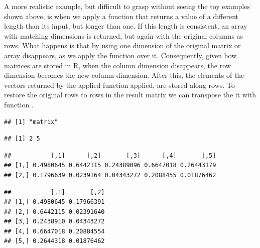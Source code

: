 \documentclass[krantz2]{krantz}\usepackage{knitr}%
\begin{document}
\begin{warningbox}
A more realistic example, but difficult to grasp without seeing the toy examples shown above, is when we apply a function that returns a value of a different length than its input, but longer than one. If this length is consistent, an array with matching dimensions is returned, but again with the original columns as rows. What happens is that by using  one dimension of the original matrix or array disappears, as we apply the function over it. Consequently, given how matrices are stored in R, when the column dimension disappears, the row dimension becomes the new column dimension. After this, the elements of the vectors returned by the applied function applied, are stored along rows. To restore the original rows to rows in the result matrix we can transpose the it with function .

\begin{knitrout}\footnotesize
{}\color{fgcolor}\begin{kframe}
\begin{alltt}
\hlstd{(}\hlstd{)}
 \hlkwb{<-} \hlstd{(}\hlstd{(}\hlstd{),}  \hlstd{=} \hlstd{)}
 \hlkwb{<-} \hlstd{(}\hlstd{,}  \hlstd{=} \hlstd{) \{}
       \hlstd{(}      
    \hlstd{\}}
 \hlkwb{<-} \hlstd{(}   \hlstd{=} \hlstd{,}    \hlstd{=} \hlstd{)}
\end{alltt}
\begin{verbatim}
## [1] "matrix"
\end{verbatim}
\begin{alltt}
\end{alltt}
\begin{verbatim}
## [1] 2 5
\end{verbatim}
\begin{alltt}
\end{alltt}
\begin{verbatim}
##           [,1]      [,2]       [,3]      [,4]       [,5]
## [1,] 0.4980645 0.6442115 0.24389096 0.6647018 0.26443179
## [2,] 0.1796639 0.0239164 0.04343272 0.2088455 0.01876462
\end{verbatim}
\begin{alltt}
\end{alltt}
\begin{verbatim}
##           [,1]       [,2]
## [1,] 0.4980645 0.17966391
## [2,] 0.6442115 0.02391640
## [3,] 0.2438910 0.04343272
## [4,] 0.6647018 0.20884554
## [5,] 0.2644318 0.01876462
\end{verbatim}
\end{kframe}
\end{knitrout}


\end{warningbox}
\end{document}
